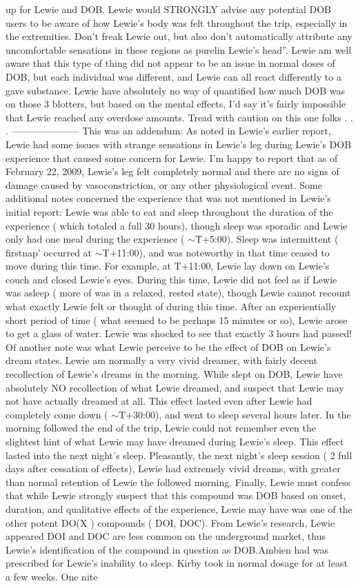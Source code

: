 \documentclass[12pt]{book}
\begin{document}
up for Lewie and DOB. Lewie would STRONGLY advise any potential DOB users to be aware of how Lewie's body was felt throughout the trip, especially in the extremities. Don't freak Lewie out, but also don't automatically attribute any uncomfortable sensations in these regions as purelin Lewie's head''. Lewie am well aware that this type of thing did not appear to be an issue in normal doses of DOB, but each individual was different, and Lewie can all react differently to a gave substance. Lewie have absolutely no way of quantified how much DOB was on those 3 blotters, but based on the mental effects, I'd say it's fairly impossible that Lewie reached any overdose amounts. Tread with caution on this one folks . . .  --------------------- This was an addendum: As noted in Lewie's earlier report, Lewie had some issues with strange sensations in Lewie's leg during Lewie's DOB experience that caused some concern for Lewie. I'm happy to report that as of February 22, 2009, Lewie's leg felt completely normal and there are no signs of damage caused by vasoconstriction, or any other physiological event. Some additional notes concerned the experience that was not mentioned in Lewie's initial report: Lewie was able to eat and sleep throughout the duration of the experience ( which totaled a full 30 hours), though sleep was sporadic and Lewie only had one meal during the experience ( $\sim$T+5:00). Sleep was intermittent ( firstnap' occurred at $\sim$T+11:00), and was noteworthy in that time ceased to move during this time. For example, at T+11:00, Lewie lay down on Lewie's couch and closed Lewie's eyes. During this time, Lewie did not feel as if Lewie was asleep ( more of was in a relaxed, rested state), though Lewie cannot recount what exactly Lewie felt or thought of during this time. After an experientially short period of time ( what seemed to be perhaps 15 minutes or so), Lewie arose to get a glass of water. Lewie was shocked to see that exactly 3 hours had passed! Of another note was what Lewie perceive to be the effect of DOB on Lewie's dream states. Lewie am normally a very vivid dreamer, with fairly decent recollection of Lewie's dreams in the morning. While slept on DOB, Lewie have absolutely NO recollection of what Lewie dreamed, and suspect that Lewie may not have actually dreamed at all. This effect lasted even after Lewie had completely come down ( $\sim$T+30:00), and went to sleep several hours later. In the morning followed the end of the trip, Lewie could not remember even the slightest hint of what Lewie may have dreamed during Lewie's sleep. This effect lasted into the next night's sleep. Pleasantly, the next night's sleep session ( 2 full days after cessation of effects), Lewie had extremely vivid dreams, with greater than normal retention of Lewie the followed morning. Finally, Lewie must confess that while Lewie strongly suspect that this compound was DOB based on onset, duration, and qualitative effects of the experience, Lewie may have was one of the other potent DO(X ) compounds ( DOI, DOC). From Lewie's research, Lewie appeared DOI and DOC are less common on the underground market, thus Lewie's identification of the compound in question as DOB.Ambien had was prescribed for Lewie's inability to sleep. Kirby took in normal dosage for at least a few weeks. One nite 
\end{document}
